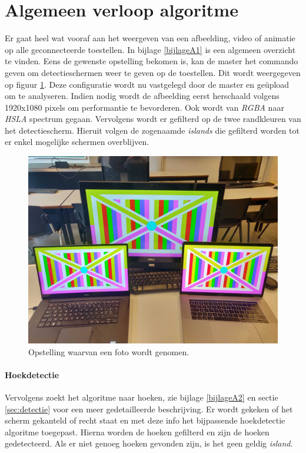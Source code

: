 \section{Algemeen verloop algoritme}
Er gaat heel wat vooraf aan het weergeven van een afbeelding, video of animatie op alle geconnecteerde toestellen. In bijlage \ref{bijlageA1} is een algemeen overzicht te vinden.
\bigskip
Eens de gewenste opstelling bekomen is, kan de master het commando geven om detectieschermen weer te geven op de toestellen. Dit wordt weergegeven op figuur \ref{fig:opstelling}. Deze configuratie wordt nu vastgelegd door de master en geüpload om te analyseren. Indien nodig wordt de afbeelding eerst herschaald volgens 1920x1080 pixels om performantie te bevorderen. Ook wordt van {\it RGBA} naar {\it HSLA} spectrum gegaan. Vervolgens wordt er gefilterd op de twee randkleuren van het detectiescherm. Hieruit volgen de zogenaamde {\it islands} die gefilterd worden tot er enkel mogelijke schermen overblijven.

\begin{figure}[H]
	\centering
	\includegraphics[scale=0.06]{img/opstelling.jpg}
	\caption{Opstelling waarvan een foto wordt genomen.}
	\label{fig:opstelling}
\end{figure}

\paragraph{Hoekdetectie}
Vervolgens zoekt het algoritme naar hoeken, zie bijlage \ref{bijlageA2} en sectie \ref{sec:detectie} voor een meer gedetailleerde beschrijving. Er wordt gekeken of het scherm gekanteld of recht staat en met deze info het bijpassende hoekdetectie algoritme toegepast. Hierna worden de hoeken gefilterd en zijn de hoeken gedetecteerd. Als er niet genoeg hoeken gevonden zijn, is het geen geldig {\it island}.

